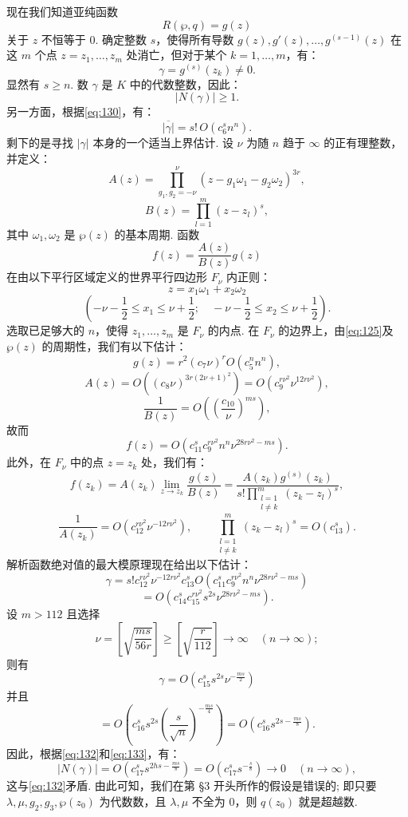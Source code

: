 现在我们知道亚纯函数
\[
R(\wp, q) = g(z)
\]
关于 $z$ 不恒等于 0. 确定整数 $s$，使得所有导数 $g(z), g'(z), \dots, g^{(s-1)}(z)$ 在这 $m$ 个点 $z = z_1, \dots, z_m$ 处消亡，但对于某个 $k=1, \dots, m$，有：
\[
\gamma = g^{(s)}(z_k) \neq 0.
\]
显然有 $s \ge n$. 数 $\gamma$ 是 $K$ 中的代数整数，因此：
\begin{equation}
|N(\gamma)| \ge 1. \tag{132}\label{eq:132}
\end{equation}
另一方面，根据\eqref{eq:130}，有：
\begin{equation}
\overline{|\gamma|} = s! \, O(c_6^s n^n). \tag{133}\label{eq:133}
\end{equation}
剩下的是寻找 $|\gamma|$ 本身的一个适当上界估计. 设 $\nu$ 为随 $n$ 趋于 $\infty$ 的正有理整数，并定义：
\[
A(z) = \prod_{g_1, g_2 = -\nu}^{\nu} (z - g_1 \omega_1 - g_2 \omega_2)^{3r},
\]
\[
B(z) = \prod_{l=1}^{m} (z-z_l)^{s},
\]
其中 $\omega_1, \omega_2$ 是 $\wp(z)$ 的基本周期. 函数
\[
f(z) = \frac{A(z)}{B(z)} g(z)
\]
在由以下平行区域定义的世界平行四边形 $F_\nu$ 内正则：
\[
z = x_{1}\omega_{1} + x_{2}\omega_{2}
\]
\[
(-\nu - \frac{1}{2} \le x_{1} \le \nu + \frac{1}{2}; \quad -\nu - \frac{1}{2} \le x_{2} \le \nu + \frac{1}{2}).
\]
选取已足够大的 $n$，使得 $z_1, \dots, z_m$ 是 $F_{\nu}$ 的内点. 在 $F_{\nu}$ 的边界上，由\eqref{eq:125}及 $\wp(z)$ 的周期性，我们有以下估计：
\[
g(z) = r^2 (c_7 \nu)^r O(c_5^n n^n),
\]
\[
A(z) = O((c_8 \nu)^{3r(2\nu+1)^2}) = O(c_9^{r\nu^2} \nu^{12r\nu^2}),
\]
\[
\frac{1}{B(z)} = O\left(\left(\frac{c_{10}}{\nu}\right)^{ms}\right),
\]
故而
\[
f(z) = O(c_{11}^s c_9^{r\nu^2} n^n \nu^{28r\nu^2 - ms}).
\]
此外，在 $F_{\nu}$ 中的点 $z=z_k$ 处，我们有：
\[
f(z_k) = A(z_k) \lim_{z \to z_k} \frac{g(z)}{B(z)} = \frac{A(z_k)g^{(s)}(z_k)}{s! \prod_{\substack{l=1\\l \neq k}}^{m} (z_k-z_l)^s},
\]
\[
\frac{1}{A(z_k)} = O(c_{12}^{r\nu^2} \nu^{-12r\nu^2}), \qquad \prod_{\substack{l=1\\l \neq k}}^m (z_k - z_l)^s = O(c_{13}^s).
\]
解析函数绝对值的最大模原理现在给出以下估计：
\[
\gamma = s! c_{12}^{r\nu^2} \nu^{-12r\nu^2} c_{13}^s O(c_{11}^s c_9^{r\nu^2} n^n \nu^{28r\nu^2 - ms})
\]
\[
= O(c_{14}^s c_{15}^{r\nu^2} s^{2s} \nu^{28r\nu^2 - ms}).
\]
设 $m > 112$ 且选择
\[
\nu = \left[ \sqrt{\frac{ms}{56r}} \right] \ge \left[ \sqrt{\frac{r}{112}} \right] \to \infty \quad (n \to \infty);
\]
则有
\[
\gamma = O(c_{15}^s s^{2s} \nu^{-\frac{ms}{2}})
\]
并且
\[
= O\left(c_{16}^s s^{2s} \left(\frac{s}{\sqrt{n}}\right)^{-\frac{ms}{4}}\right) = O\left(c_{16}^s s^{2s-\frac{ms}{8}}\right).
\]
因此，根据\eqref{eq:132}和\eqref{eq:133}，有：
\[
|N(\gamma)| = O\left(c_{17}^s s^{2hs - \frac{ms}{8}}\right) = O\left(c_{17}^s s^{-\frac{s}{8}}\right) \to 0 \quad (n \to \infty),
\]
这与\eqref{eq:132}矛盾. 由此可知，我们在第 \S 3 开头所作的假设是错误的; 即只要 $\lambda, \mu, g_2, g_3, \wp(z_0)$ 为代数数，且 $\lambda, \mu$ 不全为 0，则 $q(z_0)$ 就是超越数.

